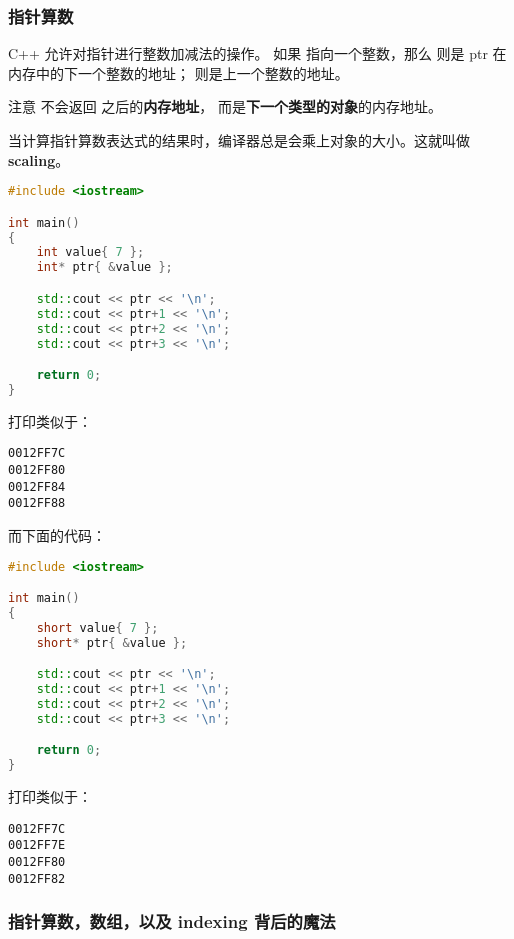 \documentclass[../../LearnCpp.tex]{subfiles}
\begin{document}

\subsubsection*{指针算数}

C++ 允许对指针进行整数加减法的操作。
如果  指向一个整数，那么  则是 ptr 在内存中的下一个整数的地址；
 则是上一个整数的地址。

注意  不会返回  之后的\textbf{内存地址}，
而是\textbf{下一个类型的对象}的内存地址。

当计算指针算数表达式的结果时，编译器总是会乘上对象的大小。这就叫做 \textbf{scaling}。

\begin{lstlisting}[language=C++]
#include <iostream>

int main()
{
    int value{ 7 };
    int* ptr{ &value };

    std::cout << ptr << '\n';
    std::cout << ptr+1 << '\n';
    std::cout << ptr+2 << '\n';
    std::cout << ptr+3 << '\n';

    return 0;
}
\end{lstlisting}

打印类似于：

\begin{lstlisting}
0012FF7C
0012FF80
0012FF84
0012FF88
\end{lstlisting}

而下面的代码：

\begin{lstlisting}[language=C++]
#include <iostream>

int main()
{
    short value{ 7 };
    short* ptr{ &value };

    std::cout << ptr << '\n';
    std::cout << ptr+1 << '\n';
    std::cout << ptr+2 << '\n';
    std::cout << ptr+3 << '\n';

    return 0;
}
\end{lstlisting}

打印类似于：

\begin{lstlisting}
0012FF7C
0012FF7E
0012FF80
0012FF82
\end{lstlisting}

\subsubsection*{指针算数，数组，以及 indexing 背后的魔法}
\end{document}
